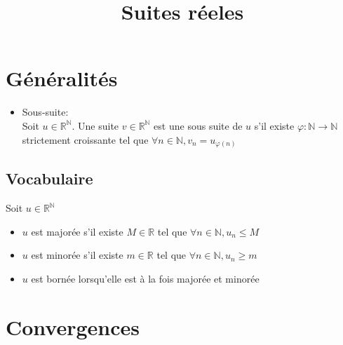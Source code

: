 \documentclass[fleqn]{article}
\title{Suites r\'eeles}
\date{}
\begin{document}
\maketitle

\section{G\'en\'eralit\'es}
\begin{itemize}
	\item Sous-suite: \\
		Soit $u \in \mathbb{R}^\mathbb{N}$. Une suite $v \in \mathbb{R}^\mathbb{N}$ est une sous suite de $u$ s'il existe
		$\varphi: \mathbb{N} \rightarrow \mathbb{N}$ strictement croissante tel que $\forall n \in \mathbb{N}, v_n = u_{\varphi(n)}$ \\
\end{itemize}

\subsection{Vocabulaire}
Soit $u \in \mathbb{R}^\mathbb{N}$
\begin{itemize}
	\item $u$ est major\'ee s'il existe $M \in \mathbb{R}$ tel que $\forall n \in \mathbb{N}, u_n \leq M$
	\item $u$ est minor\'ee s'il existe $m \in \mathbb{R}$ tel que $\forall n \in \mathbb{N}, u_n \geq m$
	\item $u$ est born\'ee lorsqu'elle est \`a la fois major\'ee et minor\'ee
\end{itemize}

\section{Convergences}
\end{document}
